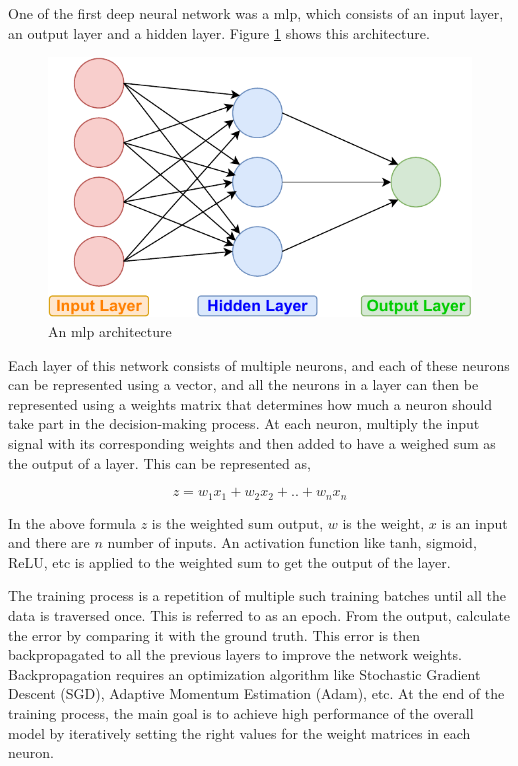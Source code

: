 One of the first deep neural network was a \acrfull{mlp}, which consists of an input layer, an output layer and a hidden layer. Figure \ref{fig:mlp} shows this architecture. 

\begin{figure}[ht]
  \begin{center}
    \includegraphics[width=\textwidth]{images/MLP.pdf} 
    \caption{An \acrshort{mlp} architecture}
    \label{fig:mlp}
  \end{center}
\end{figure}

Each layer of this network consists of multiple neurons, and each of these neurons can be represented using a vector, and all the neurons in a layer can then be represented using a weights matrix that determines how much a neuron should take part in the decision-making process. At each neuron, multiply the input signal with its corresponding weights and then added to have a weighed sum as the output of a layer. This can be represented as,

\[ z = w_1x_1 + w_2x_2 + .. + w_nx_n \]

In the above formula $z$ is the weighted sum output, $w$ is the weight, $x$ is an input and there are $n$ number of inputs. An activation function like tanh, sigmoid, ReLU, etc is applied to the weighted sum to get the output of the layer. 

The training process is a repetition of multiple such training batches until all the data is traversed once. This is referred to as an epoch. From the output, calculate the error by comparing it with the ground truth. This error is then backpropagated to all the previous layers to improve the network weights. Backpropagation requires an optimization algorithm like Stochastic Gradient Descent (SGD), Adaptive Momentum Estimation (Adam), etc. At the end of the training process, the main goal is to achieve high performance of the overall model by iteratively setting the right values for the weight matrices in each neuron.

